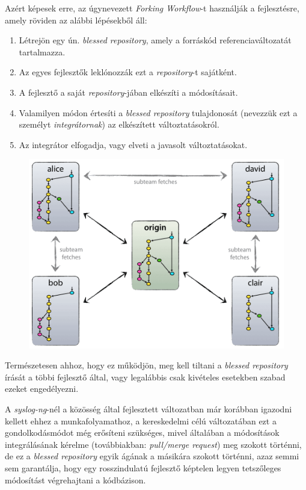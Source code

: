 Azért képesek erre, az úgynevezett \emph{Forking Workflow}-t használják a fejlesztésre, amely röviden
az alábbi lépésekből áll:
\begin{enumerate}
    \item{Létrejön egy ún. \emph{blessed repository}, amely a forráskód referenciaváltozatát
        tartalmazza.}
    \item{Az egyes fejlesztők leklónozzák ezt a \emph{repository}-t sajátként.}
    \item{A fejlesztő a saját \emph{repository}-jában elkészíti a módosításait.}
    \item{Valamilyen módon értesíti a \emph{blessed repository} tulajdonosát
        (nevezzük ezt a személyt \emph{integrátornak}) az elkészített változtatásokról.}
    \item{Az integrátor elfogadja, vagy elveti a javasolt változtatásokat.}
\end{enumerate}

\begin{figure}[h]
    \centering
    \includegraphics[width=\textwidth, height=0.25\textheight, keepaspectratio]{figures/forkingworkflow.png}
\end{figure}
\FloatBarrier

Természetesen ahhoz, hogy ez működjön, meg kell tiltani a \emph{blessed repository} írását a
többi fejlesztő által, vagy legalábbis csak kivételes esetekben szabad ezeket engedélyezni.

A \emph{syslog-ng}-nél a közösség által fejlesztett változatban már korábban igazodni kellett
ehhez a munkafolyamathoz, a kereskedelmi célú változatában ezt a gondolkodásmódot még erősíteni
szükséges, mivel általában a módosítások integrálásának kérelme (továbbiakban: \emph{pull/merge request})
meg szokott történni, de ez a \emph{blessed repository} egyik ágának a másikára szokott történni,
azaz semmi sem garantálja, hogy egy rosszindulatú fejlesztő képtelen legyen tetszőleges módosítást
végrehajtani a kódbázison.

